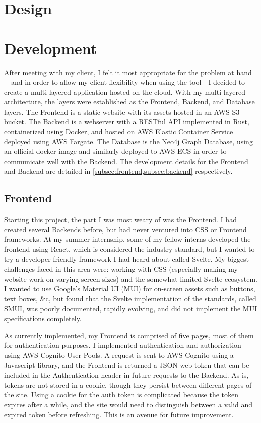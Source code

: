 \documentclass{paper}
\begin{document}
\section{Design}
\label{sec:design}

\section{Development}
\label{sec:develop}
After meeting with my client, I felt it most appropriate for the problem at hand---and in order to allow my client flexibility when using the tool---I decided to create a multi-layered application hosted on the cloud.
With my multi-layered architecture, the layers were established as the Frontend, Backend, and Database layers.
The Frontend is a static website with its assets hosted in an AWS S3 bucket.
The Backend is a webserver with a RESTful API implemented in Rust, containerized using Docker, and hosted on AWS Elastic Container Service deployed using AWS Fargate.
The Database is the Neo4j Graph Database, using an official docker image and similarly deployed to AWS ECS in order to communicate well with the Backend.
The development details for the Frontend and Backend are detailed in \cref{subsec:frontend,subsec:backend} respectively.

\subsection{Frontend}
\label{subsec:frontend}
Starting this project, the part I was most weary of was the Frontend.
I had created several Backends before, but had never ventured into CSS or Frontend frameworks.
At my summer internship, some of my fellow interns developed the frontend using React, which is considered the industry standard, but I wanted to try a developer-friendly framework I had heard about called Svelte.
My biggest challenges faced in this area were: working with CSS (especially making my website work on varying screen sizes) and the somewhat-limited Svelte ecosystem.
I wanted to use Google's Material UI (MUI) for on-screen assets such as buttons, text boxes, \&c, but found that the Svelte implementation of the standards, called SMUI, was poorly documented, rapidly evolving, and did not implement the MUI specifications completely.

As currently implemented, my Frontend is comprised of five pages, most of them for authentication purposes.
I implemented authentication and authorization using AWS Cognito User Pools.
A request is sent to AWS Cognito using a Javascript library, and the Frontend is returned a JSON web token that can be included in the Authentication header in future requests to the Backend.
As is, tokens are not stored in a cookie, though they persist between different pages of the site.
Using a cookie for the auth token is complicated because the token expires after a while, and the site would need to distinguish between a valid and expired token before refreshing.
This is an avenue for future improvement.
\end{document}
